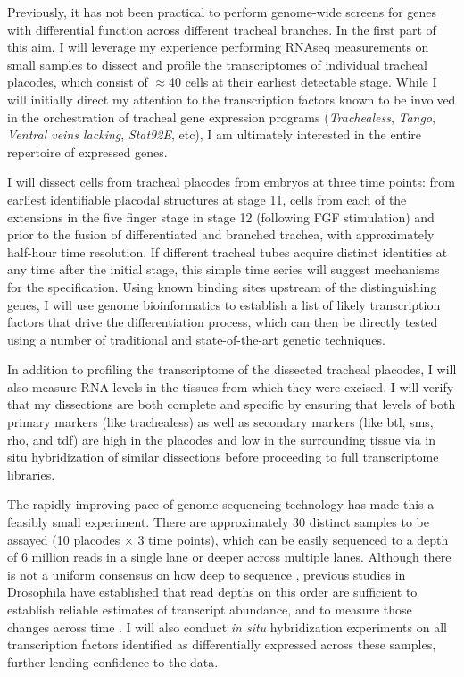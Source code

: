 \documentclass{proposal}
\begin{document}
Previously, it has not been practical to perform genome-wide screens for genes with differential function across different tracheal branches.
In the first part of this aim, I will leverage my experience performing RNAseq measurements on small samples to dissect and profile the transcriptomes of individual tracheal placodes, which consist of $\approx$40 cells at their earliest detectable stage.
While I will initially direct my attention to the transcription factors known to be involved in the orchestration of tracheal gene expression programs ({\em Trachealess}, {\em Tango}, {\em Ventral veins lacking}, {\em Stat92E}, etc), I am ultimately interested in the entire repertoire of expressed genes.

I will dissect cells from tracheal placodes from embryos at three time points: from earliest identifiable placodal structures at stage 11, cells from each of the extensions in the five finger stage in stage 12 (following FGF stimulation) and prior to the fusion of differentiated and branched trachea, with approximately half-hour time resolution.
If different tracheal tubes acquire distinct identities at any time after the initial stage, this simple time series will suggest mechanisms for the specification.
Using known binding sites upstream of the distinguishing genes, I will use genome bioinformatics to establish a list of likely transcription factors that drive the differentiation process, which can then be directly tested using a number of traditional and state-of-the-art genetic techniques.

In addition to profiling the transcriptome of the dissected tracheal placodes, I will also measure RNA levels in the tissues from which they were excised.
I will verify that my dissections are both complete and specific by ensuring that levels of both primary markers (like trachealess) as well as secondary markers (like btl, sms, rho, and tdf) are high in the placodes and low in the surrounding tissue via in situ hybridization of similar dissections before proceeding to full transcriptome libraries.

The rapidly improving pace of genome sequencing technology has made this a feasibly small experiment.
There are approximately 30 distinct samples to be assayed (10 placodes $\times$ 3 time points), which can be easily sequenced to a depth of 6 million reads in a single lane or deeper across multiple lanes.
Although there is not a uniform consensus on how deep to sequence \cite{Sims:2014ci}, previous studies in Drosophila have established that read depths on this order are sufficient to establish reliable estimates of transcript abundance, and to measure those changes across time \cite{Lott:2011cc, Combs:2013jy}.
I will also conduct {\em in situ} hybridization experiments on all transcription factors identified as differentially expressed across these samples, further lending confidence to the data.
\end{document}

